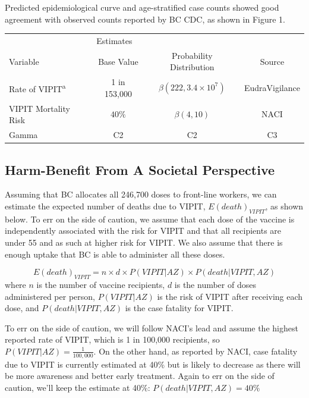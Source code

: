 \documentclass[]{interact}
\theoremstyle{plain}%
\theoremstyle{definition}
\theoremstyle{remark}
\begin{document}
Predicted epidemiological curve and age-stratified case counts showed
good agreement with observed counts reported by BC CDC, as shown in
Figure 1.

\begin{table}
{\begin{tabular}{lccc} \toprule
 & \multicolumn{2}{l}{Estimates} \\ \cmidrule{2-4}
 Variable & Base Value & Probability Distribution & Source \\ \midrule
 Rate of VIPIT\textsuperscript{a} & 1 in 153,000 & $\beta(222, 3.4\times 10^7)$ & EudraVigilance  \\
 VIPIT Mortality Risk & $40\%$ & $\beta(4, 10)$ & NACI  \\
 Gamma & C2 & C2 & C3  \\ \bottomrule
\end{tabular}}
\label{sample-table}
\end{table}

\hypertarget{harm-benefit-from-a-societal-perspective}{%
\subsection{Harm-Benefit From A Societal
Perspective}\label{harm-benefit-from-a-societal-perspective}}

Assuming that BC allocates all 246,700 doses to front-line workers, we
can estimate the expected number of deaths due to VIPIT,
\(E(death)_{VIPIT}\), as shown below. To err on the side of caution, we
assume that each dose of the vaccine is independently associated with
the risk for VIPIT and that all recipients are under 55 and as such at
higher risk for VIPIT. We also assume that there is enough uptake that
BC is able to administer all these doses.

\[
E(death)_{VIPIT}  = n \times d \times P(VIPIT|AZ) \times P(death|VIPIT, AZ)
\] where \(n\) is the number of vaccine recipients, \(d\) is the number
of doses administered per person, \(P(VIPIT|AZ)\) is the risk of VIPIT
after receiving each dose, and \(P(death|VIPIT, AZ)\) is the case
fatality for VIPIT.

To err on the side of caution, we will follow NACI's lead and assume the
highest reported rate of VIPIT, which is 1 in 100,000 recipients, so
\(P(VIPIT|AZ) = \frac{1}{100,000}\). On the other hand, as reported by
NACI, case fatality due to VIPIT is currently estimated at 40\% but is
likely to decrease as there will be more awareness and better early
treatment. Again to err on the side of caution, we'll keep the estimate
at 40\%: \(P(death|VIPIT, AZ)=40\%\)
\end{document}
